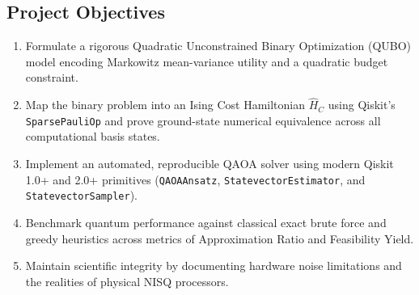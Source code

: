\subsection{Project Objectives}
\begin{enumerate}
    \item Formulate a rigorous Quadratic Unconstrained Binary Optimization (QUBO) model encoding Markowitz mean-variance utility and a quadratic budget constraint.
    \item Map the binary problem into an Ising Cost Hamiltonian $\hat{H}_C$ using Qiskit's \texttt{SparsePauliOp} and prove ground-state numerical equivalence across all computational basis states.
    \item Implement an automated, reproducible QAOA solver using modern Qiskit 1.0+ and 2.0+ primitives (\texttt{QAOAAnsatz}, \texttt{StatevectorEstimator}, and \texttt{StatevectorSampler}).
    \item Benchmark quantum performance against classical exact brute force and greedy heuristics across metrics of Approximation Ratio and Feasibility Yield.
    \item Maintain scientific integrity by documenting hardware noise limitations and the realities of physical NISQ processors.
\end{enumerate}
